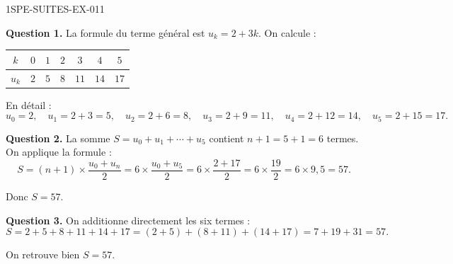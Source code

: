 \begin{corrige}{1SPE-SUITES-EX-011}


\textbf{Question 1.} La formule du terme général est $u_k = 2 + 3k$. On calcule :

\medskip
\begin{tabular}{|c|c|c|c|c|c|c|}
\hline
$k$ & $0$ & $1$ & $2$ & $3$ & $4$ & $5$ \\
\hline
$u_k$ & $2$ & $5$ & $8$ & $11$ & $14$ & $17$ \\
\hline
\end{tabular}
\medskip

En détail :
\[
u_0 = 2, \quad u_1 = 2+3 = 5, \quad u_2 = 2+6 = 8, \quad u_3 = 2+9 = 11, \quad u_4 = 2+12 = 14, \quad u_5 = 2+15 = 17.
\]


\textbf{Question 2.} La somme $S = u_0 + u_1 + \cdots + u_5$ contient $n + 1 = 5 + 1 = 6$ termes. On applique la formule :
\[
S = (n+1) \times \frac{u_0 + u_n}{2} = 6 \times \frac{u_0 + u_5}{2} = 6 \times \frac{2 + 17}{2} = 6 \times \frac{19}{2} = 6 \times 9{,}5 = 57.
\]

Donc $S = 57$.


\textbf{Question 3.} On additionne directement les six termes :
\[
S = 2 + 5 + 8 + 11 + 14 + 17 = (2 + 5) + (8 + 11) + (14 + 17) = 7 + 19 + 31 = 57.
\]

On retrouve bien $S = 57$. \checkmark

\end{corrige}
